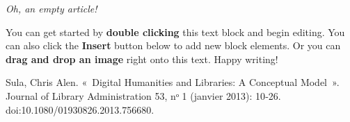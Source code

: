 \textit{Oh, an empty article!} 

You can get started by \textbf{double clicking} this text block and begin editing. You can also click the \textbf{Insert} button below to add new block elements. Or you can \textbf{drag and drop an image} right onto this text. Happy writing!

Sula, Chris Alen. « Digital Humanities and Libraries: A Conceptual Model ». Journal of Library Administration 53, nᵒ 1 (janvier 2013): 10‑26. doi:10.1080/01930826.2013.756680.
